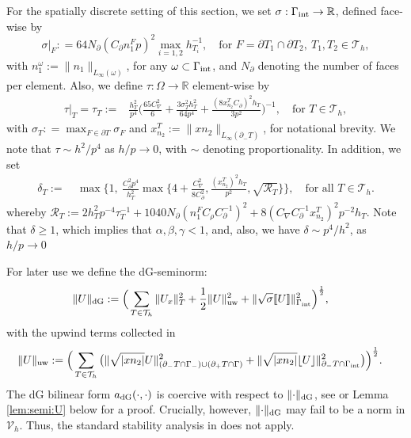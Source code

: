 \documentclass{amsart}
\newcommand{\norm}[2]{\|{#1}\|_{{#2}}}
\newcommand{\jump}[1]{[\kern-0.6mm [{#1}]\kern-0.6mm]}
\newcommand{\Th}{\mathcal{T}_h}
\newcommand{\gint}{\Gamma_{\rm int}}
\newcommand{\gif}{\Gamma_-}
\newcommand{\cinvT}{C_{\partial}}
\newcommand{\cinv}{C_{\nabla}}
\newcommand{\normal}{{n}}
\newcommand{\jumpu}[1]{ \lfloor #1 \rfloor }
\newcommand{\xn}{x_{n_2}^{T}}
\theoremstyle{definition}
\theoremstyle{remark}
\numberwithin{equation}{section}
\begin{document}
For the spatially discrete setting of this section, we set $\sigma:\gint\to\mathbb{R}$, defined face-wise by
\begin{equation}\label{eq:sigma_def}
    \sigma|_F :  = 64N_{\partial} (\cinvT n_1^Fp)^2 \max_{i=1,2} h_{T_i}^{-1}, \quad \text{for } F = \partial T_1 \cap \partial T_2,\ T_1,T_2 \in \Th,
\end{equation}
with $n_1^\omega:=\norm{n_1}{L_\infty(\omega)}$, for any $\omega\subset\gint$, and $N_\partial$ denoting the number of faces per element.  Also, we define $\tau:\Omega\to\mathbb{R}$ element-wise by
\begin{equation}\label{def: tau}
\begin{split}
    \tau|_{T}^{}=\tau_T^{}
    := &
    \frac{h_T^2}{p^4}\Big( \frac{65\cinv^2}{6}+\frac{3\sigma_T^2 h_T^2}{64p^4}+\frac{(8\xn\cinvT)^2 h_T}{3p^2}\Big)^{-1},
        \quad \text{for } T\in \Th,
    \end{split}
\end{equation}
with $\sigma_T: = \max_{F\in \partial T}{\sigma_F}$ and $\xn:=\norm{{xn_2}}{L_\infty(\partial_-T)}$, for notational brevity. We note that $\tau \sim h^2/p^4$ as  $h/p\to 0$, with $\sim$ denoting proportionality. In addition, we set
\begin{equation}\label{def:delta_def}\begin{split} \delta_T:=&\ \max\bigg\{1,\  \frac{\cinvT^2p^4}{h_T^2}\max\Big\{4+\frac{\cinv^2}{8
    	\cinvT^2},\frac{(\xn)^2h_T}{p^2},\sqrt{\mathcal{R}_T}\Big\}\bigg\}, \quad \text{for all $T\in \Th$}.
    \end{split}
\end{equation}
whereby
$\mathcal{R}_T:=2h_T^2 p^{-4} \tau_T^{-1}+1040N_\partial (n_1^FC_\rho\cinvT^{-1})^2+ 8(\cinv	\cinvT^{-1}\xn)^2p^{-2} h_T
$.
 Note that $\delta\ge 1$, which implies that $\alpha, \beta,\gamma<1$, and, also, we have
$\delta \sim p^4/h^2$,  as $h/p\to 0$

For later use we define the dG-seminorm:
\begin{equation}\label{dG:norm space}
\begin{split}
\norm{U}{\rm dG} &:=  \Big( \sum_{T \in \Th}\norm{U_x}{T}^2
+\frac{1}{2}\norm{U}{\rm uw}^2
    +
  \norm{\sqrt{\sigma} \jump{U}}{\gint }^2\Big)^{\frac{1}{2}},
\end{split}
\end{equation}
with the upwind terms collected in
\[
	\begin{split}
		\norm{U}{\rm uw} &:=  \Big( \sum_{T \in \Th}
		\big(\norm{ \sqrt{|x\normal_2|} U}{ (\partial_- T \cap \gif )\cup( \partial_+ T \cap \Gamma )}^2
+
		\norm{ \sqrt{|x\normal_2|} \jumpu{U}}{ \partial_- T \cap \gint }^2
	\big)\Big)^{\frac{1}{2}}.
	\end{split}
\]
The dG bilinear form $a_{\rm dG}(\cdot,\cdot)$ is coercive with respect to $\norm{\cdot}{\rm dG}$, see \cite{hss} or Lemma \ref{lem:semi:U} below for a proof. Crucially, however, $\norm{\cdot}{\rm dG}$ may fail to be a norm in $ {\mathcal{V}}_h$. Thus, the standard stability analysis in \cite{hss} does not apply.
\end{document}
